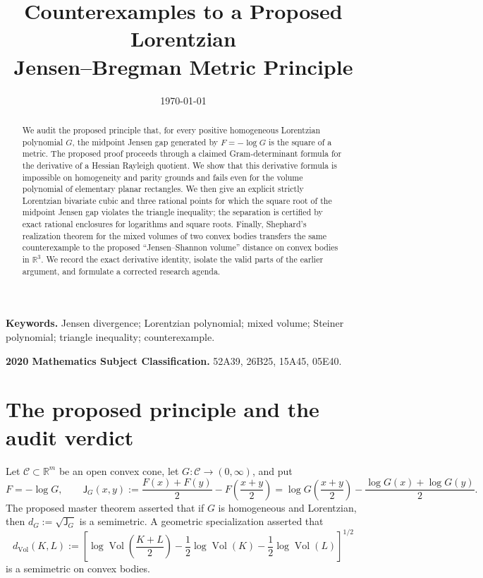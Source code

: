 \documentclass[11pt]{article}
\title{Counterexamples to a Proposed Lorentzian\\Jensen--Bregman Metric Principle}
\author{}
\date{\today}
\theoremstyle{definition}
\newcommand{\R}{\mathbb{R}}
\newcommand{\C}{\mathcal{C}}
\newcommand{\J}{\mathsf{J}}
\newcommand{\Vol}{\operatorname{Vol}}
\begin{document}
\maketitle

\begin{abstract}
We audit the proposed principle that, for every positive homogeneous Lorentzian polynomial
$G$, the midpoint Jensen gap generated by $F=-\log G$ is the square of a metric.  The
proposed proof proceeds through a claimed Gram-determinant formula for the derivative of
a Hessian Rayleigh quotient.  We show that this derivative formula is impossible on
homogeneity and parity grounds and fails even for the volume polynomial of elementary
planar rectangles.  We then give an explicit strictly Lorentzian bivariate cubic and three
rational points for which the square root of the midpoint Jensen gap violates the triangle
inequality; the separation is certified by exact rational enclosures for logarithms and square
roots.  Finally, Shephard's realization theorem for the mixed volumes of two convex
bodies transfers the same counterexample to the proposed ``Jensen--Shannon volume''
distance on convex bodies in $\R^3$.  We record the exact derivative identity, isolate the
valid parts of the earlier argument, and formulate a corrected research agenda.
\end{abstract}

\noindent\textbf{Keywords.} Jensen divergence; Lorentzian polynomial; mixed volume; Steiner polynomial; triangle inequality; counterexample.

\medskip
\noindent\textbf{2020 Mathematics Subject Classification.} 52A39, 26B25, 15A45, 05E40.

\section{The proposed principle and the audit verdict}

Let $\C\subset\R^m$ be an open convex cone, let $G:\C\to(0,\infty)$, and put
\[
 F=-\log G,
 \qquad
 \J_G(x,y)
 :=\frac{F(x)+F(y)}2-F\!\left(\frac{x+y}{2}\right)
 =\log G\!\left(\frac{x+y}{2}\right)
   -\frac{\log G(x)+\log G(y)}2.
\]
The proposed master theorem asserted that if $G$ is homogeneous and Lorentzian, then
$d_G:=\sqrt{\J_G}$ is a semimetric.  A geometric specialization asserted that
\[
 d_{\Vol}(K,L)
 :=\left[
 \log\Vol\!\left(\frac{K+L}{2}\right)
 -\frac12\log\Vol(K)-\frac12\log\Vol(L)
 \right]^{1/2}
\]
is a semimetric on convex bodies.
\end{document}
